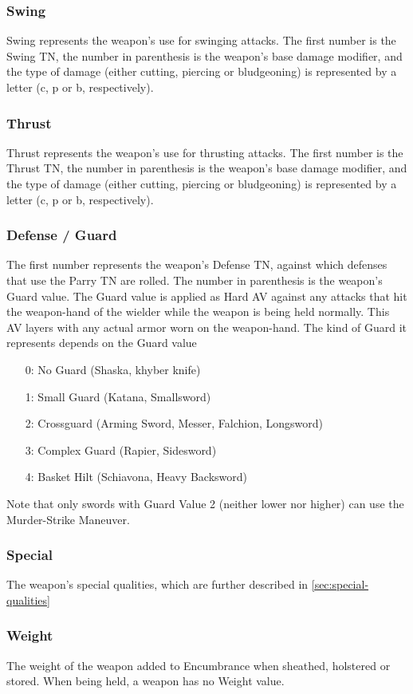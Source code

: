 \documentclass[oneside,11pt,english]{book}
\begin{document}
\subsubsection{Swing}
Swing represents the weapon’s use for swinging attacks. The first number is the Swing TN, the number in parenthesis 
is the weapon’s base damage modifier, and the type of damage (either cutting, piercing or bludgeoning) is represented 
by a letter (c, p or b, respectively). 
\subsubsection{Thrust}
Thrust represents the weapon’s use for thrusting attacks. The first number is the Thrust TN, the number in parenthesis 
is the weapon’s base damage modifier, and the type of damage (either cutting, piercing or bludgeoning) is represented 
by a letter (c, p or b, respectively). 
\subsubsection{Defense / Guard}
The first number represents the weapon’s Defense TN, against which defenses that use the Parry TN are rolled. The 
number in parenthesis is the weapon’s Guard value. The Guard value is applied as Hard AV against any attacks that hit
the weapon-hand of the wielder while the weapon is being held normally. This AV layers with any actual armor worn 
on the weapon-hand. The kind of Guard it represents depends on the Guard value
\begin{itemize}
	\item [0:] No Guard (Shaska, khyber knife)
	\item [1:] Small Guard (Katana, Smallsword)
	\item [2:] Crossguard (Arming Sword, Messer, Falchion, Longsword)
	\item [3:] Complex Guard (Rapier, Sidesword)
	\item [4:] Basket Hilt (Schiavona, Heavy Backsword)
\end{itemize}
Note that only swords with Guard Value 2 (neither lower nor higher) can use the Murder-Strike Maneuver. %
\subsubsection{Special}
The weapon’s special qualities, which are further described in \autoref{sec:special-qualities}
\subsubsection{Weight}
The weight of the weapon added to Encumbrance when sheathed, holstered or stored. When being held, a weapon has 
no Weight value.
\end{document}
